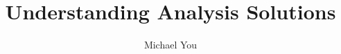 \documentclass{article}
\title{Understanding Analysis Solutions}
\author{Michael You}
\date{}
\begin{document}
\begin{titlingpage}
\maketitle
\end{titlingpage}


\end{document}
